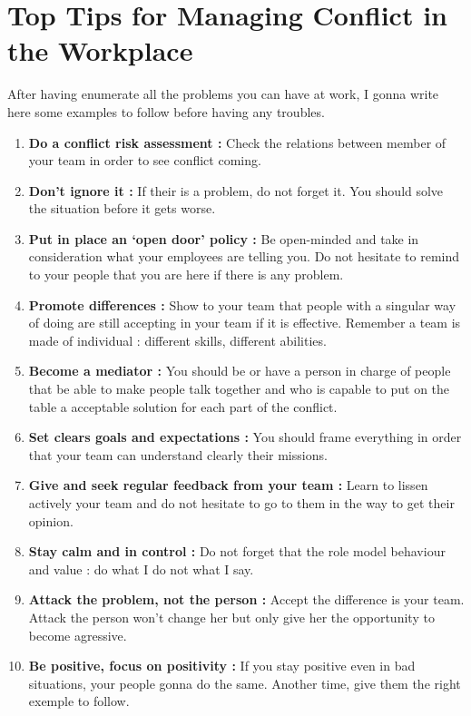 \documentclass[a4paper,12pt]{report} %
\begin{document}
\section{Top Tips for Managing Conflict in the Workplace}
After having enumerate all the problems you can have at work, I gonna write here some examples to follow before having any troubles.
\begin{enumerate}
\item \textbf{Do a conflict risk assessment :} Check the relations between member of your team in order to see conflict coming.
\item \textbf{Don’t ignore it :} If their is a problem, do not forget it. You should solve the situation before it gets worse.
\item \textbf{Put in place an ‘open door’ policy :} Be open-minded and take in consideration what your employees are telling you. Do not hesitate to remind to your people that you are here if there is any problem.
\item \textbf{Promote differences :} Show to your team that people with a singular way of doing are still accepting in your team if it is effective. Remember a team is made of individual : different skills, different abilities.
\item \textbf{Become a mediator :} You should be or have a person in charge of people that be able to make people talk together and who is capable to put on the table a acceptable solution for each part of the conflict.
\item \textbf{Set clears goals and expectations :} You should frame everything in order that your team can understand clearly their missions.
\item \textbf{Give and seek regular feedback from your team :} Learn to lissen actively your team and do not hesitate to go to them in the way to get their opinion.
\item \textbf{Stay calm and in control :} Do not forget that the role model behaviour and value : do what I do not what I say.
\item \textbf{Attack the problem, not the person :} Accept the difference is your team. Attack the person won't change her but only give her the opportunity to become agressive.
\item \textbf{Be positive, focus on positivity :} If you stay positive even in bad situations, your people gonna do the same. Another time, give them the right exemple to follow.
\end{enumerate}
\end{document}
